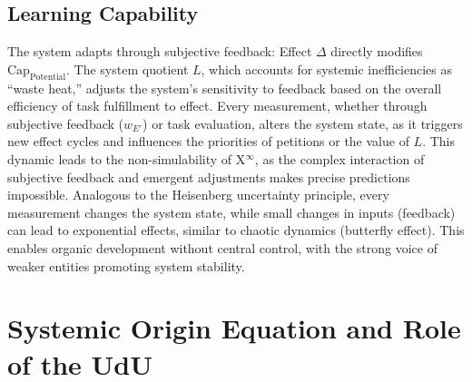 \documentclass[12pt]{scrartcl}
\begin{document}
\subsection{Learning Capability}
The system adapts through subjective feedback: Effect $\Delta$ directly modifies $\text{Cap}_{\text{Potential}}$. The system quotient $L$, which accounts for systemic inefficiencies as “waste heat,” adjusts the system’s sensitivity to feedback based on the overall efficiency of task fulfillment to effect. Every measurement, whether through subjective feedback ($w_{E'}$) or task evaluation, alters the system state, as it triggers new effect cycles and influences the priorities of petitions or the value of $L$. This dynamic leads to the non-simulability of X$^\infty$, as the complex interaction of subjective feedback and emergent adjustments makes precise predictions impossible. Analogous to the Heisenberg uncertainty principle, every measurement changes the system state, while small changes in inputs (feedback) can lead to exponential effects, similar to chaotic dynamics (butterfly effect). This enables organic development without central control, with the strong voice of weaker entities promoting system stability.

\section{Systemic Origin Equation and Role of the UdU}
\label{sec:Ursprungsgleichung_UdU}
\end{document}
